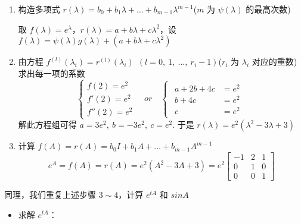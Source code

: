 \begin{solution}
\begin{enumerate}
                    \item 构造多项式 $r(\lambda) = b_0 + b_1\lambda + \dots + b_{m-1}\lambda^{m-1}$($m$ 为 $\psi(\lambda)$ 的最高次数)
                        \par 取 $f(\lambda) = e^{\lambda}$，$r(\lambda) = a + b\lambda + c\lambda^2$，设 $f(\lambda) = \psi(\lambda)g(\lambda) + (a + b\lambda + c\lambda^2)$
                    \item 由方程 $f^{(l)}(\lambda_i) = r^{(l)}(\lambda_i) \ \ (l = 0, \ 1, \ \dots, \ r_i - 1)$($r_i$ 为 $\lambda_i$ 对应的重数) 求出每一项的系数
                        \begin{equation*}
                            \begin{cases}
                                f(2) = e^2 \\ f'(2) = e^2 \\ f''(2) = e^2
                            \end{cases} \quad or \quad \begin{cases} \begin{aligned}
                                a + 2b + 4c &= e^2 \\ b + 4c &= e^2 \\  c &= e^2 
                                \end{aligned}    
                            \end{cases}
                        \end{equation*}
                        解此方程组可得 $a = 3e^2, \ b = -3e^2, \ c = e^2$. 于是 $r(\lambda) = e^2(\lambda^2 - 3\lambda + 3)$
                    \item 计算 $f(A) = r(A) = b_0I + b_1A + \dots + b_{m-1}A^{m-1}$
                        \begin{equation*}
                            e^A = f(A) = r(A) = e^2(A^2 - 3A + 3) = e^2\begin{bmatrix}
                                -1 & 2 & 1 \\ 0 & 1 & 0 \\ 0 & 0 & 1
                            \end{bmatrix}
                        \end{equation*}
                \end{enumerate}
                \par 同理，我们重复上述步骤 $3 \sim 4$，计算 $e^{tA}$ 和 $sinA$
                \begin{itemize}
                    \item 求解 $e^{tA}$：

\end{itemize}
\end{solution}
